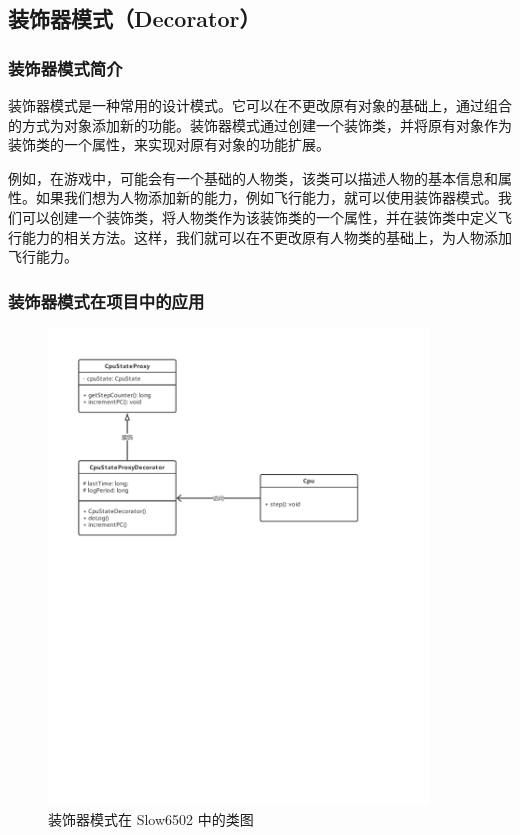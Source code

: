 \documentclass[cn,black,12pt,normal]{elegantnote}
\begin{document}
\subsection{装饰器模式（Decorator）}

\subsubsection{装饰器模式简介}


装饰器模式是一种常用的设计模式。它可以在不更改原有对象的基础上，通过组合的方式为对象添加新的功能。装饰器模式通过创建一个装饰类，并将原有对象作为装饰类的一个属性，来实现对原有对象的功能扩展。

例如，在游戏中，可能会有一个基础的人物类，该类可以描述人物的基本信息和属性。如果我们想为人物添加新的能力，例如飞行能力，就可以使用装饰器模式。我们可以创建一个装饰类，将人物类作为该装饰类的一个属性，并在装饰类中定义飞行能力的相关方法。这样，我们就可以在不更改原有人物类的基础上，为人物添加飞行能力。

\subsubsection{装饰器模式在项目中的应用}

\begin{figure}[H]
  \centering
  \includegraphics[width=0.9\textwidth]{figures/装饰器模式.pdf}
  \caption{装饰器模式在 Slow6502 中的类图}
\end{figure}
\end{document}
